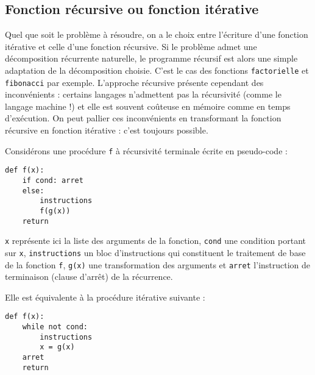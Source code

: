 \subsection{Fonction récursive ou fonction itérative}\label{sub:recursivite-itérativite}
Quel que soit le problème à résoudre, on a le choix entre l'écriture d'une fonction itérative et celle d'une
fonction récursive. Si le problème admet une décomposition récurrente naturelle, le programme récursif est
alors une simple adaptation de la décomposition choisie. C'est le cas des fonctions {\tt factorielle} et
{\tt fibonacci} par exemple. 
L'approche récursive présente cependant des inconvénients :
certains langages n'admettent pas la récursivité (comme le langage machine !)
et elle est souvent coûteuse en mémoire comme en temps d'exécution. 
On peut pallier ces inconvénients en transformant la fonction récursive 
en fonction itérative : c'est toujours possible.

Considérons une procédure {\tt f} à récursivité terminale écrite en pseudo-code :

\noindent\mbox{}\hspace*{1cm}\begin{py}{4cm}
\begin{verbatim}
def f(x):
    if cond: arret
    else:
        instructions
        f(g(x))
    return
\end{verbatim}
\end{py}
\hfill
\begin{py}{9cm}
{\tt x} représente ici la liste des arguments de la fonction,
{\tt cond} une condition portant sur {\tt x}, 
{\tt instructions} un bloc d'instructions qui constituent
le traitement de base de la fonction {\tt f}, 
{\tt g(x)} une transformation des arguments et {\tt arret}
l'instruction de terminaison (clause d'arrêt) de la récurrence.
\end{py}

\vspace*{2mm}

\noindent Elle est équivalente à la procédure itérative suivante :\label{methode:recursivite}

\noindent\mbox{}\hspace*{1cm}\begin{py}{4cm}
\begin{verbatim}
def f(x):
    while not cond: 
        instructions
        x = g(x)
    arret
    return
\end{verbatim}
\end{py}

